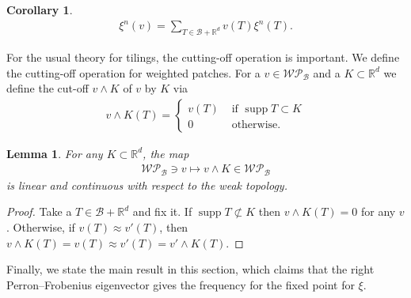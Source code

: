\documentclass[a4]{amsart}
\DeclareMathOperator{\supp}{supp}
\newcommand{\sci}{\wedge}
\newcommand{\WP}{\mathcal{W}\mathcal{P}}
\newtheorem{lem}[theorem]{Lemma}
\newtheorem{cor}[theorem]{Corollary}
\theoremstyle{definition}
\begin{document}
\begin{cor}
 \begin{align*}
  \xi^n(v)=\sum_{T\in\mathcal{B}+\mathbb{R}^d}v(T)\xi^n(T).
 \end{align*}
\end{cor}

For the usual theory for tilings, the cutting-off operation is important.
We define the cutting-off operation for weighted patches.
For a $v\in\WP_{\mathcal{B}}$ and a $K\subset\mathbb{R}^d$ we define the cut-off $v\sci K$ of
$v$ by $K$ via
\begin{align*}
 v\sci K(T)=
\begin{cases}
 v(T) &\text{ if $\supp T\subset K$}\\
0 &\text{ otherwise.}
\end{cases}
\end{align*}

\begin{lem}
 For any $K\subset\mathbb{R}^d$, the map
\begin{align*}
 \WP_{\mathcal{B}}\ni v\mapsto v\sci K\in\WP_{\mathcal{B}}
\end{align*}
is linear and continuous with respect to the weak topology.
\end{lem}

\begin{proof}
 Take a $T\in\mathcal{B}+\mathbb{R}^d$ and fix it.
If $\supp T\not\subset K$ then $v\sci K(T)=0$ for any $v$. Otherwise, if $v(T)\approx v'(T)$,
then $v\sci K(T)=v(T)\approx v'(T)=v'\sci K(T)$.
\end{proof}

Finally,  we state the main result in this section, which claims that the right Perron--Frobenius eigenvector gives
the frequency for the fixed point for $\xi$. 
\end{document}
